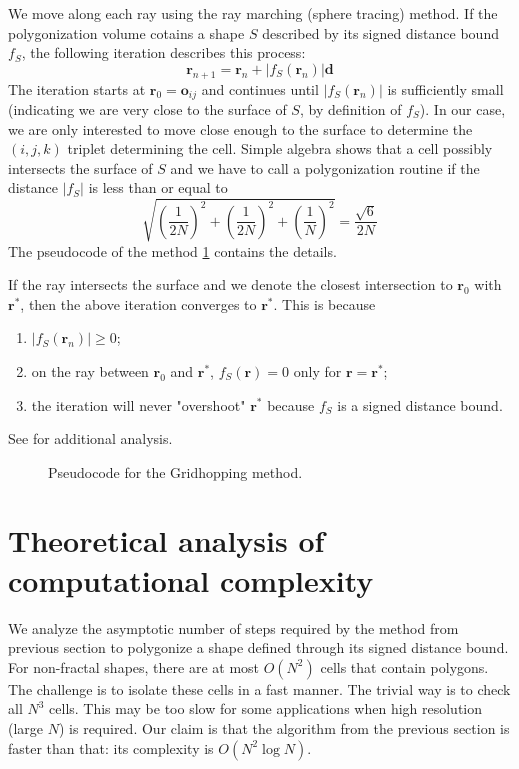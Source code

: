 \documentclass[11pt,twocolumn]{article}
\begin{document}
		We move along each ray using the ray marching (sphere tracing) \cite{HartEtAl89rtfractals,Hart94spheretracing} method.
		If the polygonization volume cotains a shape $S$ described by its signed distance bound $f_S$, the following iteration describes this process:
		\begin{equation}\label{eq:iter}
			\mathbf{r}_{n+1}=
			\mathbf{r}_n + \left|f_S(\mathbf{r}_n)\right|\mathbf{d}
		\end{equation}
		The iteration starts at $\mathbf{r}_0=\mathbf{o}_{ij}$ and continues until $\left|f_S(\mathbf{r}_n)\right|$ is sufficiently small
		(indicating we are very close to the surface of $S$, by definition of $f_S$).
		In our case, we are only interested to move close enough to the surface to determine the $(i, j, k)$ triplet determining the cell.
		Simple algebra shows that a cell possibly intersects the surface of $S$ and we have to call a polygonization routine if the distance $\left|f_S\right|$ is less than or equal to
		\begin{equation}
			\sqrt{
				\left(\frac{1}{2N}\right)^2 + \left(\frac{1}{2N}\right)^2 + \left(\frac{1}{N}\right)^2
			}=
			\frac{\sqrt{6}}{2N}
		\end{equation}
		The pseudocode of the method \ref{code:method} contains the details.

		If the ray intersects the surface and we denote the closest intersection to $\mathbf{r}_0$ with $\mathbf{r}^*$,
		then the above iteration converges to $\mathbf{r}^*$.
		This is because
		\begin{enumerate}
			\item
				$\left|f_S(\mathbf{r}_n)\right|\geq 0$;
			\item
				 on the ray between $\mathbf{r}_0$ and $\mathbf{r}^*$, $f_S(\mathbf{r})=0$ only for $\mathbf{r}=\mathbf{r}^*$;
			\item
				the iteration will never "overshoot" $\mathbf{r}^*$ because $f_S$ is a signed distance bound.
		\end{enumerate}
		See \cite{Hart94spheretracing} for additional analysis.

		\begin{figure}
			\center
			\resizebox{0.5\textwidth}{!}
			{
				
			}
			\caption
			{
				Pseudocode for the Gridhopping method.
			}
			\label{code:method}
		\end{figure}

	\section{Theoretical analysis of computational complexity}\label{sec:complexity}
		We analyze the asymptotic number of steps required by the method from previous section to polygonize a shape defined through its signed distance bound.
		For non-fractal shapes, there are at most $O(N^2)$ cells that contain polygons.
		The challenge is to isolate these cells in a fast manner.
		The trivial way is to check all $N^3$ cells.
		This may be too slow for some applications when high resolution (large $N$) is required.
		Our claim is that the algorithm from the previous section is faster than that:
		its complexity is $O(N^2\log N)$.
\end{document}

